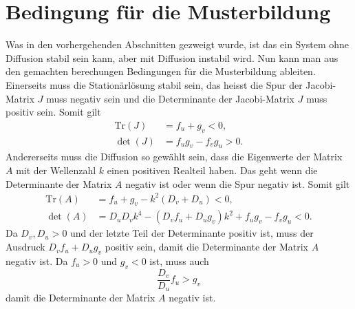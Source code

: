 \section{Bedingung für die Musterbildung
\label{reaktdiff:section:diffusioninduzierteInstabilitaet}}
Was in den vorhergehenden Abschnitten gezweigt wurde, ist das ein System ohne Diffusion stabil sein kann, aber mit Diffusion instabil wird.
Nun kann man aus den gemachten berechungen Bedingungen für die Musterbildung ableiten.
Einerseits muss die Stationärlösung stabil sein, das heisst die Spur der Jacobi-Matrix \(J\) muss negativ sein und die Determinante der Jacobi-Matrix \(J\) muss positiv sein.
Somit gilt
\begin{align*}
    \text{Tr}(J) &= f_u + g_v < 0, \\
    \det(J) &= f_u g_v - f_v g_u > 0.
\end{align*}
Andererseits muss die Diffusion so gewählt sein, dass die Eigenwerte der Matrix \(A\) mit der Wellenzahl \(k\) einen positiven Realteil haben.
Das geht wenn die Determinante der Matrix \(A\) negativ ist oder wenn die Spur negativ ist.
Somit gilt
\begin{align}
    \text{Tr}(A) &= f_u  + g_v - k^2(D_v + D_u)  < 0, \\
    \det(A) &= D_uD_vk^4 - (D_vf_u + D_ug_v)k^2 + f_u g_v - f_v g_u < 0.
    \label{reaktdiff:equation:reaktdiffbedingunen}
\end{align}
Da \(D_v,D_u > 0\) und der letzte Teil der Determinante positiv ist, muss der Ausdruck \(D_vf_u + D_ug_v\) positiv sein, damit die Determinante der Matrix \(A\) negativ ist.
Da \(f_u > 0\) und \(g_v < 0\) ist, muss auch
\begin{equation}
    \frac{D_v}{D_u}f_u > g_v
\end{equation}
damit die Determinante der Matrix \(A\) negativ ist.

